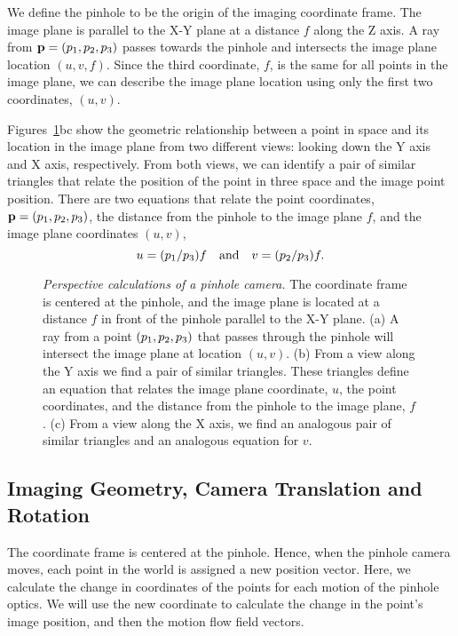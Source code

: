 We define the pinhole to be the origin of the imaging coordinate
frame.  The image plane is parallel to the X-Y plane at a distance $f$
along the Z axis.  A ray from $\mbox{${\bf p}$} =
(\mbox{${p}_{1}$},\mbox{${p}_{2}$},\mbox{${p}_{3}$})$ passes towards the pinhole
and intersects the image plane location $(u,v,f)$.  Since the third
coordinate, $f$, is the same for all points in the image plane, we can
describe the image plane location using only the first two
coordinates, $(u,v)$.

Figures~\ref{fa5:perspective}bc show the geometric relationship
between a point in space and its location in the image plane from two
different views: looking down the Y axis and X axis, respectively.
From both views, we can identify a pair of similar triangles that
relate the position of the point in three space and the image point
position.  There are two equations that relate the point coordinates,
$\mbox{${\bf p}$} = (\mbox{${p}_{1}$},\mbox{${p}_{2}$},\mbox{${p}_{3}$})$, the distance
from the pinhole to the image plane $f$, and the image plane
coordinates $(u,v)$,
\begin{equation}
\label{ea5:perspective} u = ( \mbox{${p}_{1}$} / \mbox{${p}_{3}$}) f
~~~\mbox{and}~~~ v = (\mbox{${p}_{2}$} / \mbox{${p}_{3}$} ) f .
\end{equation}
\begin{figure}
\centerline{  }
\caption[Perspective Calculation of Motion Flow Field]{ {\em
Perspective calculations of a pinhole camera.}  The coordinate
frame is centered at the pinhole, and the image plane is located at a
distance $f$ in front of the pinhole parallel to the X-Y plane.  (a) A
ray from a point $(\mbox{${p}_{1}$},\mbox{${p}_{2}$},\mbox{${p}_{3}$})$ that
passes through the pinhole will intersect the image plane at location
$(u,v)$.  (b) From a view along the Y axis we find a pair of similar
triangles.  These triangles define an equation that relates the image
plane coordinate, $u$, the point coordinates, and the distance from
the pinhole to the image plane, $f$.  (c) From a view along the X
axis, we find an analogous pair of similar triangles and an analogous
equation for $v$.}
\label{fa5:perspective}
\end{figure}

\subsection*{Imaging Geometry, Camera Translation and Rotation} The
coordinate frame is centered at the pinhole.  Hence, when the
pinhole camera moves, each point in the world is assigned a new
position vector.  Here, we calculate the change in coordinates of the
points for each motion of the pinhole optics.  We will use the new
coordinate to calculate the change in the point's image position, and
then the motion flow field vectors.

